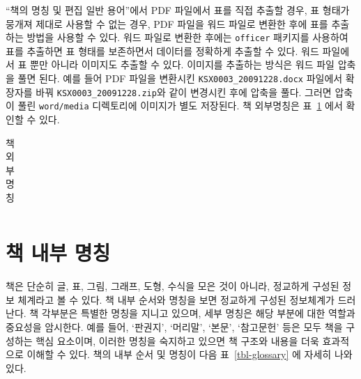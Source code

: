 \documentclass[
  letterpaper,
]{book}
\begin{document}
``책의 명칭 및 편집 일반 용어''에서 PDF 파일에서 표를 직접 추출할 경우,
표 형태가 뭉개져 제대로 사용할 수 없는 경우, PDF 파일을 워드 파일로
변환한 후에 표를 추출하는 방법을 사용할 수 있다. 워드 파일로 변환한
후에는 \texttt{officer} 패키지를 사용하여 표를 추출하면 표 형태를
보존하면서 데이터를 정확하게 추출할 수 있다. 워드 파일에서 표 뿐만
아니라 이미지도 추출할 수 있다. 이미지를 추출하는 방식은 워드 파일
압축을 풀면 된다. 예를 들어 PDF 파일을 변환시킨
\texttt{KSX0003\_20091228.docx} 파일에서 확장자를 바꿔
\texttt{KSX0003\_20091228.zip}와 같이 변경시킨 후에 압축을 풀다. 그러면
압축이 풀린 \texttt{word/media} 디렉토리에 이미지가 별도 저장된다. 책
외부명칭은 표~\ref{tbl-book-outer} 에서 확인할 수 있다.

\hypertarget{tbl-book-outer}{}
\begin{longtable}{rlll}
\caption{\label{tbl-book-outer}책 외부명칭 }\tabularnewline
\end{longtable}

\hypertarget{book-outer-content}{%
\section{책 내부 명칭}\label{book-outer-content}}

책은 단순히 글, 표, 그림, 그래프, 도형, 수식을 모은 것이 아니라,
정교하게 구성된 정보 체계라고 볼 수 있다. 책 내부 순서와 명칭을 보면
정교하게 구성된 정보체계가 드러난다. 책 각부분은 특별한 명칭을 지니고
있으며, 세부 명칭은 해당 부분에 대한 역할과 중요성을 암시한다. 예를
들어, `판권지', `머리말', `본문', `참고문헌' 등은 모두 책을 구성하는
핵심 요소이며, 이러한 명칭을 숙지하고 있으면 책 구조와 내용을 더욱
효과적으로 이해할 수 있다. 책의 내부 순서 및 명칭이 다음
표~\ref{tbl-glossary} 에 자세히 나와 있다.
\end{document}
